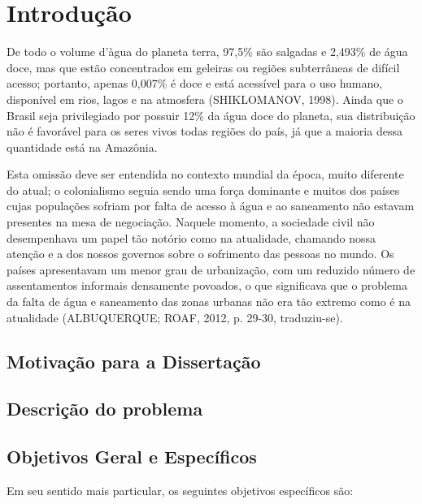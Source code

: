 \chapter{Introdução}\label{cap:introducao}

De todo o volume d'àgua do planeta terra, 97,5\% são salgadas e 2,493\% de água
doce, mas que estão concentrados em geleiras ou regiões subterrâneas de difícil
acesso; portanto, apenas 0,007\% é doce e está acessível para o uso humano,
disponível em rios, lagos e na atmosfera (SHIKLOMANOV, 1998). Ainda que o Brasil
seja privilegiado por possuir 12\% da água doce do planeta, sua distribuição não
é favorável para os seres vivos todas regiões do país, já que a maioria dessa
quantidade está na Amazônia.

\begin{citacao} 
Esta omissão deve ser entendida no contexto mundial da época,
muito diferente do atual; o colonialismo seguia sendo uma força dominante e
muitos dos países cujas populações sofriam por falta de acesso à água e ao
saneamento não estavam presentes na mesa de negociação. Naquele momento, a
sociedade civil não desempenhava um papel tão notório como na atualidade,
chamando nossa atenção e a dos nossos governos sobre o sofrimento das pessoas no
mundo. Os países apresentavam um menor grau de urbanização, com um reduzido
número de assentamentos informais densamente povoados, o que significava que o
problema da falta de água e saneamento das zonas urbanas não era tão extremo
como é na atualidade (ALBUQUERQUE; ROAF, 2012, p. 29-30, traduziu-se).
\end{citacao}

\section{Motivação para a Dissertação}\label{sec:motivacao}
\lipsum[5-6]
\lipsum[1-2]
\lipsum[3-4]

\section{Descrição do problema}\label{sec:descricao-problema}
\lipsum[3-4]
\lipsum[1-2]
\lipsum[3-4]
\lipsum[1-2]

\section{Objetivos Geral e Específicos}\label{sec:objetivos}
\lipsum[1]

Em seu sentido mais particular, os seguintes objetivos específicos são:

